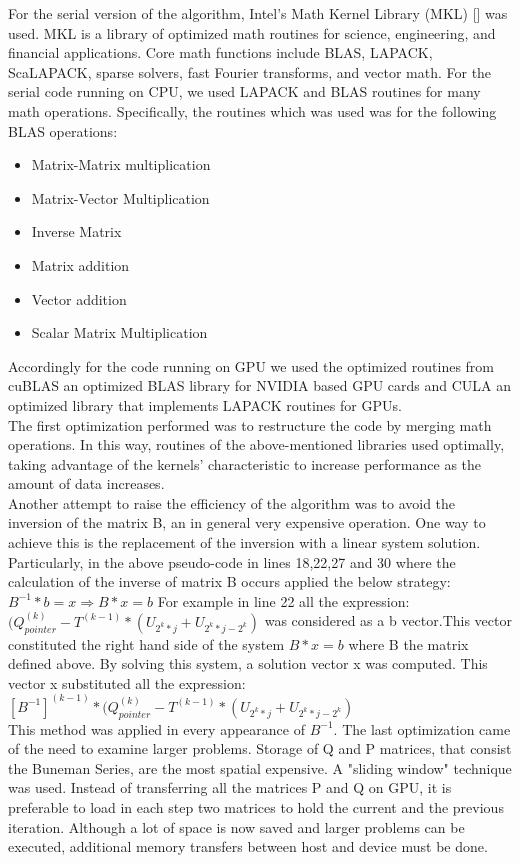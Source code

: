 For the serial version of the algorithm, Intel's Math Kernel Library (MKL) [] was used.  MKL is a library of optimized math routines for science, engineering, and financial applications. Core math functions include BLAS, LAPACK, ScaLAPACK, sparse solvers, fast Fourier transforms, and vector math.
For the serial code running on CPU, we used LAPACK and BLAS routines for many math operations. Specifically, the routines which was used was for the following BLAS operations:
\begin{itemize}
  \item Matrix-Matrix multiplication 
  \item Matrix-Vector Multiplication
  \item Inverse Matrix
  \item Matrix addition
  \item Vector addition 
  \item Scalar Matrix Multiplication
\end{itemize}

Accordingly for the code running on GPU we used the optimized routines from cuBLAS an optimized BLAS library for NVIDIA based GPU cards and CULA an optimized library that implements LAPACK routines for GPUs.\\
The first optimization performed was to restructure the code by merging math operations. In this way, routines of the above-mentioned libraries used optimally, taking advantage of the kernels' characteristic to increase performance as the amount of data increases. \\

Another attempt to raise the efficiency of the algorithm was to avoid the inversion of the matrix B, an in general very expensive operation. One way to achieve this is the replacement of the inversion with a linear system solution.
Particularly, in the above pseudo-code in lines 18,22,27 and 30 where the calculation of 
the inverse of matrix B occurs applied the below strategy:\\

$B^{-1}*b = x \Longrightarrow B*x = b$\newpage
For example in line 22 all the expression: $(Q_{pointer}^{(k)}-T^{(k-1)}*(U_{2^{k}*j}+U_{2^{k}*j-2^{k}})$ was considered as a b vector.This vector constituted the right hand side of the system $B*x = b$ where B the matrix defined above. By solving this system, a solution vector x was computed. This vector x substituted all the expression:\\
$[B^{-1}]^{(k-1)}*(Q_{pointer}^{(k)}-T^{(k-1)}*(U_{2^{k}*j}+U_{2^{k}*j-2^{k}})$\\
This method was applied in every appearance of $B^{-1}$.
The last optimization came of the need to examine larger problems. Storage of Q and P matrices, that consist the Buneman Series, are the most spatial expensive. A "sliding window" technique was used. Instead of transferring all the matrices P and Q on GPU, it is preferable to load in each step two matrices to hold the current and the previous iteration. Although a lot of space is now saved and larger problems can be executed, additional memory transfers between host and device must be done.\\

